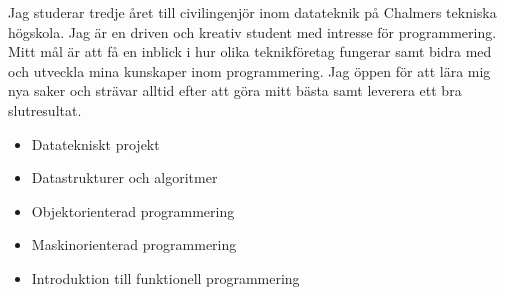 







Jag studerar tredje året till civilingenjör 
inom datateknik på Chalmers tekniska
högskola. Jag är en driven och kreativ 
student med intresse för programmering. 
Mitt mål är att få en inblick i hur olika
teknikföretag fungerar samt bidra med och
utveckla mina kunskaper inom programmering. 
Jag öppen för att lära mig nya saker och 
strävar alltid efter att göra mitt 
bästa samt leverera ett bra slutresultat.





\begin{itemize}
    \item Datatekniskt projekt
    \item Datastrukturer och algoritmer
    \item Objektorienterad programmering
    \item Maskinorienterad programmering
    \item Introduktion till funktionell programmering
\end{itemize}

